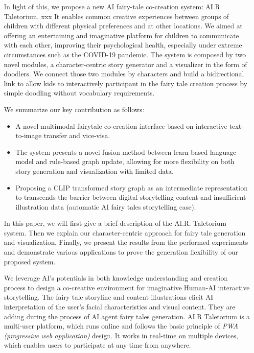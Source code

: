 In light of this, we propose a new AI fairy-tale co-creation system: AI.R Taletorium. 
xxx %
It enables common creative experiences between groups of children with different physical preferences and at other locations. We aimed at offering an entertaining and imaginative platform for children to communicate with each other, improving their psychological health, especially under extreme circumstances such as the COVID-19 pandemic. The system is composed by two novel modules, a character-centric story generator and a visualizer in the form of doodlers. We connect those two modules by characters and build a bidirectional link to allow kids to interactively participant in the fairy tale creation process by simple doodling without vocabulary requirements.

We summarize our key contribution as follows: 
\begin{itemize}
\item A novel multimodal fairytale co-creation interface based on interactive text-to-image transfer and vice-visa.

\item The system presents a novel fusion method between learn-based language model and rule-based graph update, allowing for more flexibility on both story generation and visualization with limited data.

\item Proposing a CLIP transformed story graph as an intermediate representation to transcends the barrier between digital storytelling content and insufficient illustration data (automatic AI fairy tales storytelling case).
\end{itemize}

In this paper, we will first give a brief description of the AI.R. Taletorium system. Then we explain our character-centric approach for fairy tale generation and visualization. 
Finally, we present the results from the performed experiments and demonstrate various applications to prove the generation flexibility of our proposed system. 


We leverage AI’s potentials in both knowledge understanding and creation process to design a co-creative environment for imaginative Human-AI interactive storytelling. The fairy tale storyline and content illustrations elicit AI interpretation of the user’s facial characteristics and visual content. They are adding during the process of AI agent fairy tales generation. AI.R Taletorium is a multi-user platform, which runs online and follows the basic principle of \textit{PWA (progressive web application)} design. It works in real-time on multiple devices, which enables users to participate at any time from anywhere.

